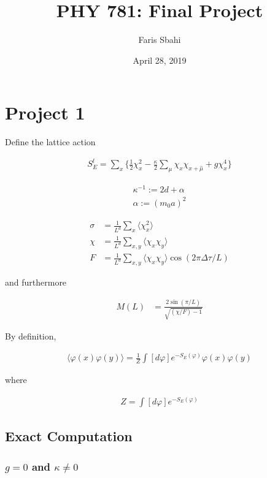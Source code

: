 \documentclass[12]{report}
\title{PHY 781: Final Project}
\date{April 28, 2019}
\author{Faris Sbahi}
\newcommand\0{\mathbf{0}}
\newcommand\<{\langle}
\renewcommand\>{\rangle}
\renewcommand\phi{\varphi}
\begin{document}
\maketitle

\chapter{Project 1}

Define the lattice action

\begin{align*}
S^l_E = \sum_x \{ \frac{1}{2} \chi_x^2 - \frac{\kappa}{2} \sum_{\mu} \chi_x \chi_{x + \hat{\mu}} + g \chi_x^4 \}
\end{align*}

\begin{align*}
\kappa^{-1} := 2d + \alpha \\
\alpha := (m_0a)^2
\end{align*}

\begin{align*}
\sigma &= \frac{1}{L^d}\sum_x \langle \chi^2_x \rangle\\
\chi &= \frac{1}{L^d}\sum_{x,y} \langle \chi_x \chi_y \rangle\\
F &= \frac{1}{L^d}\sum_{x,y} \langle \chi_x \chi_y \rangle \cos (2 \pi \Delta \tau / L)
\end{align*}

and furthermore

\begin{align*}
M(L) &= 	\frac{2 \sin (\pi / L)}{\sqrt{(\chi / F) - 1}}
\end{align*}


By definition,

\begin{align*}
\langle \phi(x) \phi(y)\rangle = \frac{1}{Z} \int [d \phi] e^{-S_E(\phi)} \phi(x) \phi(y)
\end{align*}

where 


\begin{align*}
Z = \int [d\phi] e^{-S_E(\phi)}
\end{align*}

\section{Exact Computation}

\subsection{$g=0$ and $\kappa \neq 0$}
\label{sec:free-exact}
\end{document}
